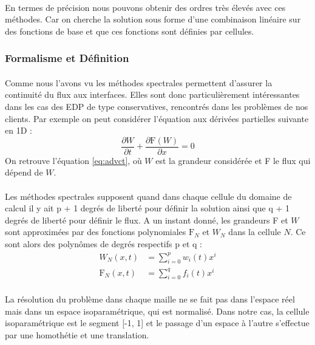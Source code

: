         \paragraph{}
        En termes de précision nous pouvons obtenir des ordres très élevés avec ces méthodes. Car on cherche la solution sous forme d'une combinaison linéaire sur des fonctions de base et que ces fonctions sont définies par cellules. 

    \subsubsection{Formalisme et Définition}
        \paragraph{}
        Comme nous l'avons vu les méthodes spectrales permettent d'assurer la continuité du flux aux interfaces. Elles sont donc particulièrement intéressantes dans les cas des EDP de type conservatives, rencontrés dans les problèmes de nos clients. Par exemple on peut considérer l'équation aux dérivées partielles suivante en 1D : $$\frac{\partial W}{\partial t} + \frac{\partial \mathrm{F}\left(W\right)}{\partial x} = 0$$ On retrouve l'équation \ref{eq:advct}, où $W$ est la grandeur considérée et F le flux qui dépend de $W$.

        \paragraph{}
        Les méthodes spectrales supposent quand dans chaque cellule du domaine de calcul il y ait p + 1 degrés de liberté pour définir la solution ainsi que q + 1 degrés de liberté pour définir le flux. A un instant donné, les grandeurs F et $W$ sont approximées par des fonctions polynomiales $\mathrm{F}_N$ et $W_N$ dans la cellule $N$. Ce sont alors des polynômes de degrés respectifs p et q :
        \begin{equation}
            \begin{split}
                W_N\left(x, t\right) &= \sum_{i = 0}^p w_i\left(t\right)x^i \\
                \mathrm{F}_N\left(x, t\right) &= \sum_{i = 0}^q f_i\left(t\right)x^i
            \end{split}
            \label{eq:sol_flux_as_polynomials}
        \end{equation}

        \paragraph{}
        La résolution du problème dans chaque maille ne se fait pas dans l'espace réel mais dans un espace isoparamétrique, qui est normalisé. Dans notre cas, la cellule isoparamétrique est le segment [-1, 1] et le passage d'un espace à l'autre s'effectue par une homothétie et une translation.

